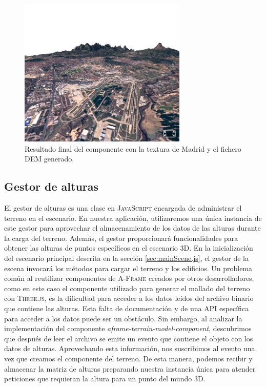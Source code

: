 \documentclass[a4paper, 11pt]{book}
\begin{document}
\begin{figure}[h]
  \centering
  \includegraphics[width=8cm, keepaspectratio]{img/madrid_terrain.jpg}
  \caption{Resultado final del componente con la textura de Madrid y el fichero DEM generado.}
  \label{fig:demAframe}
\end{figure}

\subsection{Gestor de alturas}
\label{subsec:heightManager}
El gestor de alturas es una clase en \textsc{JavaScript} encargada de administrar el terreno en el escenario. En nuestra aplicación, utilizaremos una única instancia de este gestor para aprovechar el almacenamiento de los datos de las alturas durante la carga del terreno. Además, el gestor proporcionará funcionalidades para obtener las alturas de puntos específicos en el escenario \textsc{3D}. En la inicialización del escenario principal descrita en la sección \ref{sec:mainScene.js}, el gestor de la escena invocará los métodos para cargar el terreno y los edificios.
Un problema común al reutilizar componentes de \textsc{A-Frame} creados por otros desarrolladores, como en este caso el componente utilizado para generar el mallado del terreno con \textsc{Three.js}, es la dificultad para acceder a los datos leídos del archivo binario que contiene las alturas. Esta falta de documentación y de una \gls{API} específica para acceder a los datos puede ser un obstáculo.
Sin embargo, al analizar la implementación del componente \emph{aframe-terrain-model-component}, descubrimos que después de leer el archivo se emite un evento que contiene el objeto con los datos de alturas.
Aprovechando esta información, nos suscribimos al evento una vez que creamos el componente del terreno. De esta manera, podemos recibir y almacenar la matriz de alturas preparando nuestra instancia única para atender peticiones que requieran la altura para un punto del mundo 3D.
\end{document}
